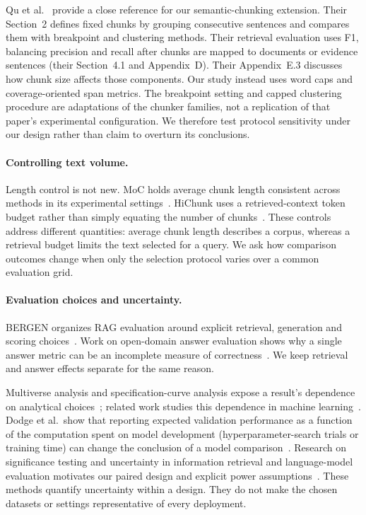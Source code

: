 \documentclass[11pt]{article}
\begin{document}
Qu et al.~\cite{qu2025semanticchunking} provide a close reference for our semantic-chunking extension. Their Section~2 defines fixed chunks by grouping consecutive sentences and compares them with breakpoint and clustering methods. Their retrieval evaluation uses F1, balancing precision and recall after chunks are mapped to documents or evidence sentences (their Section~4.1 and Appendix~D). Their Appendix~E.3 discusses how chunk size affects those components. Our study instead uses word caps and coverage-oriented span metrics. The breakpoint setting and capped clustering procedure are adaptations of the chunker families, not a replication of that paper's experimental configuration. We therefore test protocol sensitivity under our design rather than claim to overturn its conclusions.

\paragraph{Controlling text volume.}
Length control is not new. MoC holds average chunk length consistent across methods in its experimental settings~\cite{moc2025}. HiChunk uses a retrieved-context token budget rather than simply equating the number of chunks~\cite{hichunk2025}. These controls address different quantities: average chunk length describes a corpus, whereas a retrieval budget limits the text selected for a query. We ask how comparison outcomes change when only the selection protocol varies over a common evaluation grid.

\paragraph{Evaluation choices and uncertainty.}
BERGEN organizes RAG evaluation around explicit retrieval, generation and scoring choices~\cite{rau2024bergen}. Work on open-domain answer evaluation shows why a single answer metric can be an incomplete measure of correctness~\cite{kamalloo2023evaluating}. We keep retrieval and answer effects separate for the same reason.

Multiverse analysis and specification-curve analysis expose a result's dependence on analytical choices~\cite{steegen2016multiverse,simonsohn2020speccurve}; related work studies this dependence in machine learning~\cite{bell2022multiverse}. Dodge et al.\ show that reporting expected validation performance as a function of the computation spent on model development (hyperparameter-search trials or training time) can change the conclusion of a model comparison~\cite{dodge2019showyourwork}. Research on significance testing and uncertainty in information retrieval and language-model evaluation motivates our paired design and explicit power assumptions~\cite{smucker2007sigtests,urbano2019sigtesting,miller2024errorbars}. These methods quantify uncertainty within a design. They do not make the chosen datasets or settings representative of every deployment.
\end{document}
